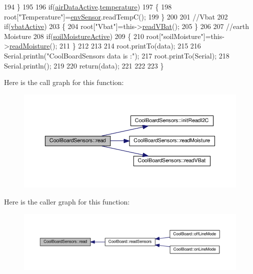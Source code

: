 \begin{DoxyCode}
194     \}   
195     
196     \textcolor{keywordflow}{if}(\hyperlink{classCoolBoardSensors_abff8dfeccb2f7689847bb64d5f1cd31e}{airDataActive}.\hyperlink{structCoolBoardSensors_1_1airActive_a9a6633c426b0508e30ebc1832ec6d745}{temperature})
197     \{
198         root[\textcolor{stringliteral}{"Temperature"}]=\hyperlink{classCoolBoardSensors_a868e38985e9a2412829fa2790ca13e2e}{envSensor}.readTempC();
199     \}
200     
201     \textcolor{comment}{//Vbat}
202     \textcolor{keywordflow}{if}(\hyperlink{classCoolBoardSensors_af5039ad760b0ff0aa7eee16c55e81702}{vbatActive})    
203     \{   
204         root[\textcolor{stringliteral}{"Vbat"}]=this->\hyperlink{classCoolBoardSensors_a6944b6ea7bce8e2fce1b434acfd9d5f3}{readVBat}();
205     \}
206     
207     \textcolor{comment}{//earth Moisture}
208     \textcolor{keywordflow}{if}(\hyperlink{classCoolBoardSensors_a31983eecc0f9cd000e1f912206ea4dc8}{soilMoistureActive})
209     \{   
210         root[\textcolor{stringliteral}{"soilMoisture"}]=this->\hyperlink{classCoolBoardSensors_a8761bff50373c485f4465c8db47d0633}{readMoisture}();
211     \}
212     
213     
214     root.printTo(data);
215 
216     Serial.println(\textcolor{stringliteral}{"CoolBoardSensors data is :"});
217     root.printTo(Serial);
218     Serial.println();
219 
220     \textcolor{keywordflow}{return}(data);   
221     
222 
223 \}
\end{DoxyCode}
Here is the call graph for this function\+:\nopagebreak
\begin{figure}[H]
\begin{center}
\leavevmode
\includegraphics[width=350pt]{classCoolBoardSensors_a91badb2539d91fda8679f2a597874c48_cgraph}
\end{center}
\end{figure}
Here is the caller graph for this function\+:\nopagebreak
\begin{figure}[H]
\begin{center}
\leavevmode
\includegraphics[width=350pt]{classCoolBoardSensors_a91badb2539d91fda8679f2a597874c48_icgraph}
\end{center}
\end{figure}
